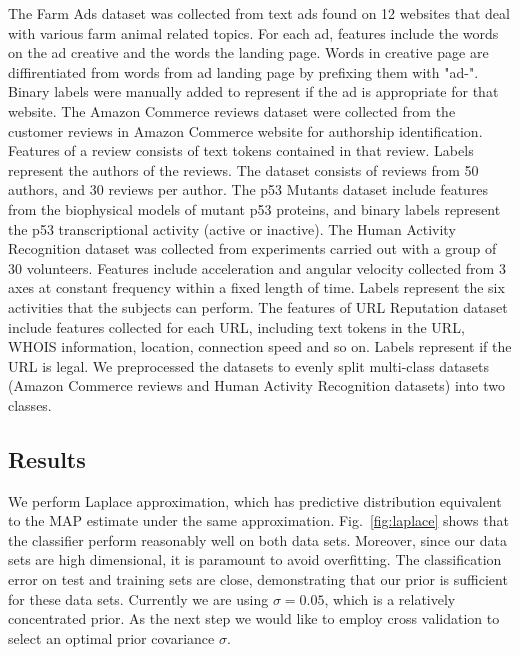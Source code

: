 The Farm Ads dataset was collected from text ads found on 12 websites that 
deal with various farm animal related topics. For each ad, features include 
the words on the ad creative and the words the landing page. Words in creative 
page are diffirentiated from words from ad landing page by prefixing them with 
"ad-". Binary labels were manually added to represent if the ad is appropriate 
for that website. The Amazon Commerce reviews dataset were collected from the 
customer reviews in Amazon Commerce website for authorship identification. 
Features of a review consists of text tokens contained in that review. Labels 
represent the authors of the reviews. The dataset consists of reviews from 50 
authors, and 30 reviews per author. The p53 Mutants dataset include features 
from the biophysical models of mutant p53 proteins, and binary labels represent 
the p53 transcriptional activity (active or inactive). The Human Activity 
Recognition dataset was collected from experiments carried out with a group of 
30 volunteers. Features include acceleration and angular velocity collected from 
3 axes at constant frequency within a fixed length of time. Labels represent the 
six activities that the subjects can perform. The features of URL Reputation dataset 
include features collected for each URL, including text tokens in the URL, 
WHOIS information, location, connection speed and so on. Labels represent if 
the URL is legal. We preprocessed the datasets to evenly split multi-class 
datasets (Amazon Commerce reviews and Human Activity Recognition datasets) 
into two classes.




\subsection{Results}

We perform Laplace approximation, which has predictive distribution equivalent
to the MAP estimate under the same approximation. Fig.~\ref{fig:laplace} shows
that the classifier perform reasonably well on both data sets. Moreover, since
our data sets are high dimensional, it is paramount to avoid overfitting. The
classification error on test and training sets are close, demonstrating that
our prior is sufficient for these data sets. Currently we are using $\sigma =
0.05$, which is a relatively concentrated prior. As the next step we would
like to employ cross validation to select an optimal prior covariance $\sigma$.

